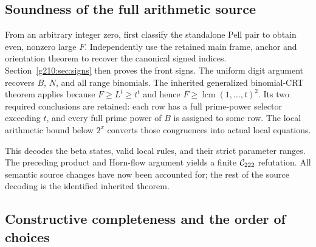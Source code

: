 \subsection{Soundness of the full arithmetic source}

From an arbitrary integer zero, first classify the standalone Pell pair to
obtain even, nonzero large $F$. Independently use the retained main frame,
anchor and orientation theorem to recover the canonical signed indices.
Section~\ref{g210:sec:signs} then proves the front signs. The uniform digit
argument recovers $B$, $N$, and all range binomials. The inherited generalized
binomial-CRT theorem applies because $F\ge L^t\ge t^t$ and hence
$F\ge\operatorname{lcm}(1,\ldots,t)^2$. Its two required conclusions are
retained: each row has a full prime-power selector exceeding $t$, and every
full prime power of $B$ is assigned to some row. The local arithmetic bound
below $2^x$ converts those congruences into actual local equations.

This decodes the beta states, valid local rules, and their strict parameter
ranges. The preceding product and Horn-flow argument yields a finite
$\mathcal C_{222}$ refutation. All semantic source changes have now been accounted for;
the rest of the source decoding is the identified inherited theorem.

\subsection{Constructive completeness and the order of choices}

